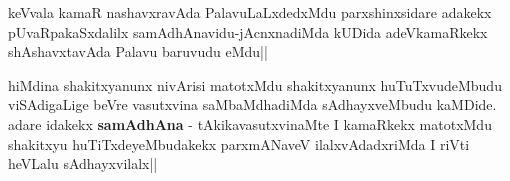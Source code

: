 
\begin{artha}
keVvala kamaR nashavxravAda PalavuLaLxdedxMdu parxshinxsidare adakekx pUvaRpakaSxdalilx samAdhAnavidu-jAcnxnadiMda kUDida adeVkamaRkekx shAshavxtavAda Palavu baruvudu eMdu||
\end{artha}


\begin{artha}
hiMdina shakitxyanunx nivArisi matotxMdu shakitxyanunx huTuTxvudeMbudu viSAdigaLige beVre vasutxvina saMbaMdhadiMda sAdhayxveMbudu kaMDide. adare idakekx \textbf{samAdhAna} - tAkikavasutxvinaMte I kamaRkekx matotxMdu shakitxyu huTiTxdeyeMbudakekx parxmANaveV ilalxvAdadxriMda I riVti heVLalu sAdhayxvilalx||
\end{artha}
